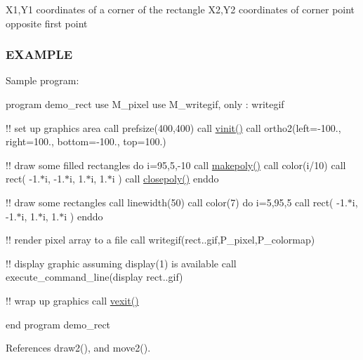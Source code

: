 X1,Y1 coordinates of a corner of the rectangle X2,Y2 coordinates of corner point opposite first point

\subsubsection*{E\+X\+A\+M\+P\+LE}

Sample program\+:

program demo\+\_\+rect use M\+\_\+pixel use M\+\_\+writegif, only \+: writegif

!! set up graphics area call prefsize(400,400) call \hyperlink{namespacem__pixel_ac03ca8f23fdadb60599b6ea4dc87a6d9}{vinit()} call ortho2(left=-\/100., right=100., bottom=-\/100., top=100.)

!! draw some filled rectangles do i=95,5,-\/10 call \hyperlink{namespacem__pixel_ab7128437f95b40004bf73fc6e3f597f8}{makepoly()} call color(i/10) call rect( -\/1.$\ast$i, -\/1.$\ast$i, 1.$\ast$i, 1.$\ast$i ) call \hyperlink{namespacem__pixel_ab3dc83b63d2ab1bf3f63932abca4245d}{closepoly()} enddo

!! draw some rectangles call linewidth(50) call color(7) do i=5,95,5 call rect( -\/1.$\ast$i, -\/1.$\ast$i, 1.$\ast$i, 1.$\ast$i ) enddo

!! render pixel array to a file call writegif(\textquotesingle{}rect..\+gif\textquotesingle{},P\+\_\+pixel,P\+\_\+colormap)

!! display graphic assuming display(1) is available call execute\+\_\+command\+\_\+line(\textquotesingle{}display rect..\+gif\textquotesingle{})

!! wrap up graphics call \hyperlink{namespacem__pixel_a19ad6b65752322b0029a62cc0ebec3e8}{vexit()}

end program demo\+\_\+rect 

References draw2(), and move2().

